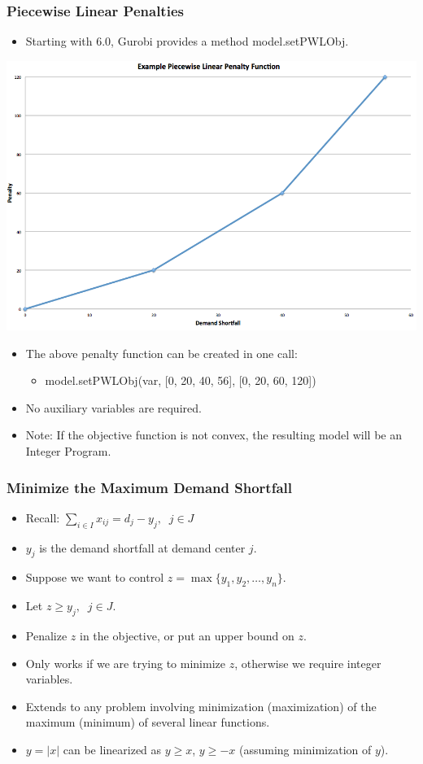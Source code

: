 \documentclass[12pt,handout]{beamer}
\begin{document}
\begin{frame}
\frametitle{Piecewise Linear Penalties}
\begin{itemize}
\item Starting with 6.0, Gurobi provides a method model.setPWLObj.
\end{itemize}
\begin{center}
\includegraphics[scale=0.2]{piecewise_linear.png}
\end{center}
\begin{itemize}
\item The above penalty function can be created in one call:
\begin{itemize}
\item model.setPWLObj(var, [0, 20, 40, 56], [0, 20, 60, 120])
\end{itemize}
\item No auxiliary variables are required.
\item Note: If the objective function is not convex, the resulting model will be an Integer Program.
\end{itemize}
\end{frame}

\begin{frame}
\frametitle{Minimize the Maximum Demand Shortfall}
\begin{itemize}
\item Recall: $\sum_{i \in I} x_{ij} = d_j - y_j,\;\;j \in J$
\item $y_j$ is the demand shortfall at demand center $j$.
\item Suppose we want to control $z = \max \{y_1, y_2, \ldots, y_n\}$.
\item Let $z \ge y_j,\;\;j \in J$.
\item Penalize $z$ in the objective, or put an upper bound on $z$.
\item Only works if we are trying to minimize $z$, otherwise we require integer variables.
\item Extends to any problem involving minimization (maximization) of the maximum (minimum) of several linear functions.
\item $y = |x|$ can be linearized as $y \ge x$, $y \ge -x$ (assuming minimization of $y$).
\end{itemize}
\end{frame}
\end{document}
